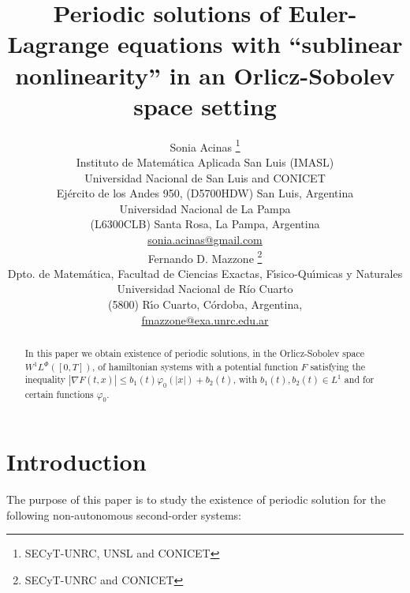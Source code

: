 \documentclass[twoside]{article}
\title{Periodic solutions of 
Euler-Lagrange equations with ``sublinear nonlinearity'' in an Orlicz-Sobolev space setting}
\author{Sonia Acinas \thanks{SECyT-UNRC, UNSL and CONICET}\\
Instituto de Matem\'atica Aplicada San Luis (IMASL)\\ 
Universidad Nacional de San Luis and CONICET\\
Ej\'ercito de los Andes 950,
(D5700HDW) San Luis, Argentina\\
Universidad Nacional de La Pampa\\
(L6300CLB) Santa Rosa, La Pampa, Argentina\\
\url{sonia.acinas@gmail.com}\\[3mm]
Fernando D. Mazzone \thanks{SECyT-UNRC and CONICET}\\
Dpto. de Matem\'atica, Facultad de Ciencias Exactas, F\'{\i}sico-Qu\'{\i}micas y Naturales\\
Universidad Nacional de R\'{i}o Cuarto\\
(5800) R\'{\i}o Cuarto, C\'ordoba, Argentina,\\
\url{fmazzone@exa.unrc.edu.ar}
}
\date{}
\theoremstyle{remark}
\newcommand{\lphi}{L^{\Phi}}
\newcommand{\wphi}{W^{1}\lphi}
\renewcommand{\leq}{\leqslant}
\begin{document}
\maketitle
%
\begingroup%
    \renewcommand{\thefootnote}{}%
    \endgroup
%
%
%
%

\begin{abstract}

In this paper we obtain existence of periodic solutions, in the Orlicz-Sobolev space $\wphi([0,T])$, of hamiltonian systems with a potential  function $F$ satisfying the inequality  $|\nabla F(t,x)|\leq b_1(t) \varphi_0(|x|)+b_2(t)$, with    $b_1(t), b_2(t)\in L^1$ and for certain functions $\varphi_0$.

\end{abstract}




\pagestyle{fancy} \headheight 35pt \fancyhead{} \fancyfoot{}

\fancyfoot[C]{\thepage}  \fancyhead[CO]{\nouppercase{\section}}

\fancyhead[CO]{\nouppercase{\leftmark}}






\section{Introduction}
The purpose of this paper is to study the existence  of periodic solution for the
following non-autonomous second-order systems:
\end{document}
